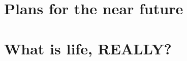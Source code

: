 \documentclass[DIV=calc, paper=a4, fontsize=12pt]{scrartcl}	 %
\begin{document}
\begin{multicols}{2}


\section*{Plans for the near future}







\section*{What is life, REALLY?}





\end{multicols}

\onecolumn


\end{document}
